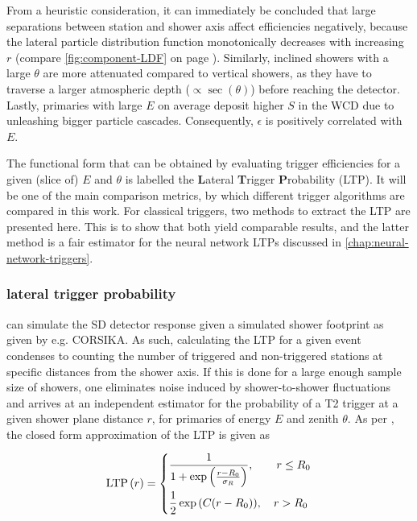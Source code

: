 From a heuristic consideration, it can immediately be concluded that large separations between station and shower axis affect efficiencies negatively, because the 
lateral particle distribution function monotonically decreases with increasing $r$ (compare \autoref{fig:component-LDF} on page \pageref{fig:component-LDF}). 
Similarly, inclined showers with a large $\theta$ are more attenuated compared to vertical showers, as they have to traverse a larger atmospheric depth 
($\propto\sec\left(\theta\right)$) before reaching the detector. Lastly, primaries with large $E$ on average deposit higher $S$ in the WCD due to unleashing bigger
particle cascades. Consequently, $\epsilon$ is positively correlated with $E$.

The functional form that can be obtained by evaluating trigger efficiencies for a given (slice of) $E$ and $\theta$ is labelled the \textbf{L}ateral 
\textbf{T}rigger \textbf{P}robability (LTP). It will be one of the main comparison metrics, by which different trigger algorithms are compared in this work. For 
classical triggers, two methods to extract the LTP are presented here. This is to show that both yield comparable results, and the latter method is a fair 
estimator for the neural network LTPs discussed in \autoref{chap:neural-network-triggers}.

\subsubsection{\Offline lateral trigger probability}
\label{sssec:offline-ltp}

\Offline can simulate the SD detector response given a simulated shower footprint as given by e.g. CORSIKA. As such, calculating the LTP for a given event
condenses to counting the number of triggered and non-triggered stations at specific distances from the shower axis. If this is done for a large enough sample size
of showers, one eliminates noise induced by shower-to-shower fluctuations and arrives at an independent estimator for the probability of a T2 trigger at a given 
shower plane distance $r$, for primaries of energy $E$ and zenith $\theta$. As per \cite{abreu2011lateral}, the closed form approximation of the LTP is given as

\begin{equation}
	\label{eq:offline-ltp}
	\text{LTP}\left(r\right) = 
	\begin{dcases}
		\frac{1}{1 + \exp\left(\frac{r - R_0}{\sigma_R}\right)}, \qquad r \leq R_0 \\
		\frac{1}{2} \exp{\left(C(r-R_0)\right)},\;\;\;\,r > R_0
	\end{dcases}
\end{equation}

